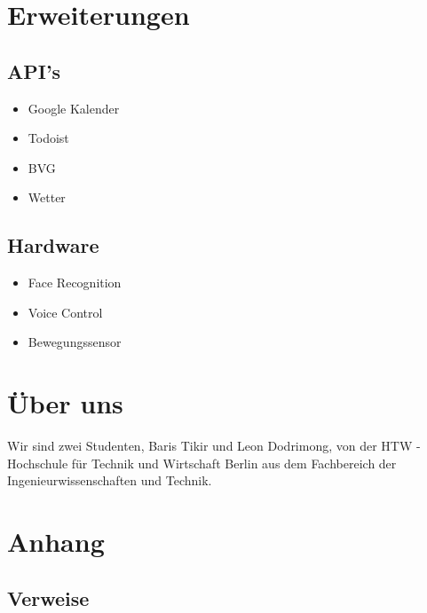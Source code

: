 \documentclass[a4paper,11pt]{article}
\begin{document}
\section{Erweiterungen}
\subsection{API's}

\begin{itemize}
\item Google Kalender
\item Todoist
\item BVG
\item Wetter
\end{itemize}
\subsection{Hardware}
\begin{itemize}
\item Face Recognition
\item Voice Control
\item Bewegungssensor
\end{itemize}


\section{Über uns}
Wir sind zwei Studenten, Baris Tikir und Leon Dodrimong, von der HTW - Hochschule für
Technik und Wirtschaft Berlin aus dem Fachbereich der Ingenieurwissenschaften und
Technik. 

\section{Anhang}
\subsection{Verweise}
\end{document}

